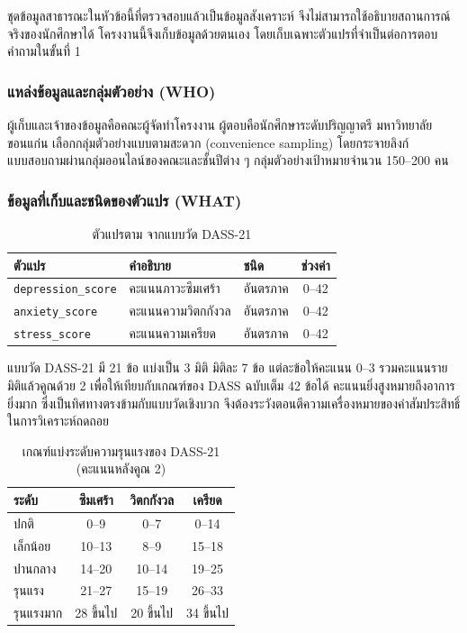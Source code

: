 ชุดข้อมูลสาธารณะในหัวข้อนี้ที่ตรวจสอบแล้วเป็นข้อมูลสังเคราะห์
จึงไม่สามารถใช้อธิบายสถานการณ์จริงของนักศึกษาได้
โครงงานนี้จึงเก็บข้อมูลด้วยตนเอง โดยเก็บเฉพาะตัวแปรที่จำเป็นต่อการตอบคำถามในขั้นที่ 1

\subsubsection*{แหล่งข้อมูลและกลุ่มตัวอย่าง (WHO)}

ผู้เก็บและเจ้าของข้อมูลคือคณะผู้จัดทำโครงงาน
ผู้ตอบคือนักศึกษาระดับปริญญาตรี มหาวิทยาลัยขอนแก่น
เลือกกลุ่มตัวอย่างแบบตามสะดวก (convenience sampling)
โดยกระจายลิงก์แบบสอบถามผ่านกลุ่มออนไลน์ของคณะและชั้นปีต่าง ๆ
กลุ่มตัวอย่างเป้าหมายจำนวน 150--200 คน

\subsubsection*{ข้อมูลที่เก็บและชนิดของตัวแปร (WHAT)}

\begin{table}[H]
\centering
\caption{ตัวแปรตาม จากแบบวัด DASS-21}
\begin{tabularx}{\textwidth}{|l|L|l|c|}
\hline
\textbf{ตัวแปร} & \textbf{คำอธิบาย} & \textbf{ชนิด} & \textbf{ช่วงค่า} \\
\hline
\texttt{depression\_score} & คะแนนภาวะซึมเศร้า & อันตรภาค & 0--42 \\
\hline
\texttt{anxiety\_score} & คะแนนความวิตกกังวล & อันตรภาค & 0--42 \\
\hline
\texttt{stress\_score} & คะแนนความเครียด & อันตรภาค & 0--42 \\
\hline
\end{tabularx}
\end{table}

\noindent
แบบวัด DASS-21 มี 21 ข้อ แบ่งเป็น 3 มิติ มิติละ 7 ข้อ แต่ละข้อให้คะแนน 0--3
รวมคะแนนรายมิติแล้วคูณด้วย 2 เพื่อให้เทียบกับเกณฑ์ของ DASS ฉบับเต็ม 42 ข้อได้
คะแนนยิ่งสูงหมายถึงอาการยิ่งมาก ซึ่งเป็นทิศทางตรงข้ามกับแบบวัดเชิงบวก
จึงต้องระวังตอนตีความเครื่องหมายของค่าสัมประสิทธิ์ในการวิเคราะห์ถดถอย

\begin{table}[H]
\centering
\caption{เกณฑ์แบ่งระดับความรุนแรงของ DASS-21 (คะแนนหลังคูณ 2)}
\begin{tabular}{|l|c|c|c|}
\hline
\textbf{ระดับ} & \textbf{ซึมเศร้า} & \textbf{วิตกกังวล} & \textbf{เครียด} \\
\hline
ปกติ & 0--9 & 0--7 & 0--14 \\
\hline
เล็กน้อย & 10--13 & 8--9 & 15--18 \\
\hline
ปานกลาง & 14--20 & 10--14 & 19--25 \\
\hline
รุนแรง & 21--27 & 15--19 & 26--33 \\
\hline
รุนแรงมาก & 28 ขึ้นไป & 20 ขึ้นไป & 34 ขึ้นไป \\
\hline
\end{tabular}
\end{table}

